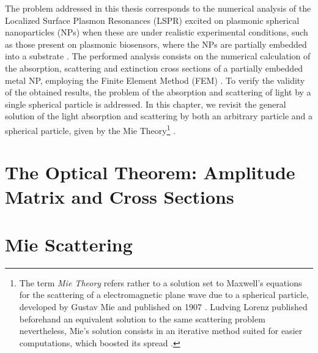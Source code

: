 \documentclass[11pt]{Latex/Classes/PhDthesisPSnPDF}
\begin{document}
  The problem addressed in this thesis corresponds to the numerical analysis of the Localized Surface Plasmon Resonances (LSPR)  excited on plasmonic spherical nanoparticles (NPs) when these are under realistic experimental conditions, such as those present on plasmonic biosensors, where the NPs are partially embedded into a substrate \cite{moirangthem_enhanced_2012}. The performed analysis consists on the numerical calculation of the absorption, scattering and extinction  cross sections of a partially embedded metal NP, employing the Finite Element Method (FEM) . To verify the validity of the obtained results, the problem of the absorption and scattering of light by a single spherical particle is addressed. In this chapter, we revisit the general solution of the light absorption and scattering by both an arbitrary particle and a spherical particle, given by the Mie Theory\footnote{The term \emph{Mie Theory} refers rather to a solution set to Maxwell's equations for the scattering of a electromagnetic plane wave due to a spherical particle, developed by Gustav Mie and published on 1907 \cite{mie_beitrage_1908}. Ludving Lorenz published beforehand an equivalent solution to the same scattering problem nevertheless, Mie's solution consists in an iterative method suited for easier computations, which boosted its spread \cite{horvath_gustav_2009}. } \cite{bohren_absorption_1983}.

	\section{The Optical Theorem: Amplitude Matrix and Cross Sections}
	 \label{s:AmpMatCrossSect}
	 

	\section{Mie Scattering}
	  \label{s:Mie}
\end{document}
